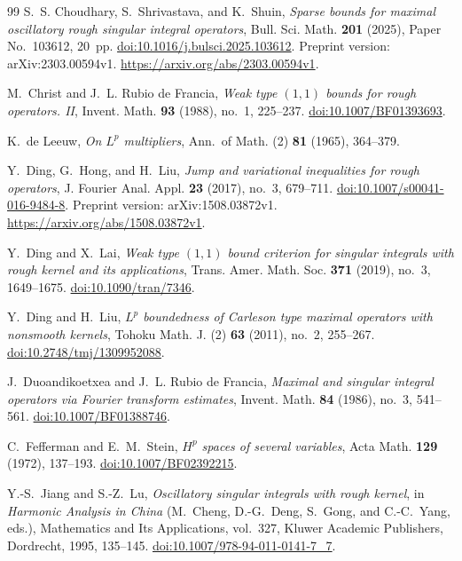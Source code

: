 \documentclass[11pt]{article}
\numberwithin{equation}{section}
\theoremstyle{remark}
\theoremstyle{definition}
\begin{document}
\begin{thebibliography}{99}
S.~S. Choudhary, S.~Shrivastava, and K.~Shuin,
\emph{Sparse bounds for maximal oscillatory rough singular integral
operators},
Bull. Sci. Math. \textbf{201} (2025), Paper No.~103612, 20~pp.
\href{https://doi.org/10.1016/j.bulsci.2025.103612}
{doi:10.1016/j.bulsci.2025.103612}.
Preprint version: arXiv:2303.00594v1.
\url{https://arxiv.org/abs/2303.00594v1}.

M.~Christ and J.~L. Rubio de Francia,
\emph{Weak type $(1,1)$ bounds for rough operators. II},
Invent. Math. \textbf{93} (1988), no.~1, 225--237.
\href{https://doi.org/10.1007/BF01393693}{doi:10.1007/BF01393693}.


K.~de Leeuw,
\emph{On $L^p$ multipliers},
Ann.\ of Math. (2) \textbf{81} (1965), 364--379.

Y.~Ding, G.~Hong, and H.~Liu,
\emph{Jump and variational inequalities for rough operators},
J. Fourier Anal. Appl. \textbf{23} (2017), no.~3, 679--711.
\href{https://doi.org/10.1007/s00041-016-9484-8}
{doi:10.1007/s00041-016-9484-8}.
Preprint version: arXiv:1508.03872v1.
\url{https://arxiv.org/abs/1508.03872v1}.

Y.~Ding and X.~Lai,
\emph{Weak type $(1,1)$ bound criterion for singular integrals with rough
kernel and its applications},
Trans. Amer. Math. Soc. \textbf{371} (2019), no.~3, 1649--1675.
\href{https://doi.org/10.1090/tran/7346}
{doi:10.1090/tran/7346}.

Y.~Ding and H.~Liu,
\emph{$L^p$ boundedness of Carleson type maximal operators with nonsmooth kernels},
Tohoku Math. J. (2) \textbf{63} (2011), no.~2, 255--267.
\href{https://doi.org/10.2748/tmj/1309952088}{doi:10.2748/tmj/1309952088}.

J.~Duoandikoetxea and J.~L. Rubio de Francia,
\emph{Maximal and singular integral operators via Fourier transform estimates},
Invent. Math. \textbf{84} (1986), no.~3, 541--561.
\href{https://doi.org/10.1007/BF01388746}{doi:10.1007/BF01388746}.

C.~Fefferman and E.~M.~Stein,
\emph{$H^p$ spaces of several variables},
Acta Math. \textbf{129} (1972), 137--193.
\href{https://doi.org/10.1007/BF02392215}{doi:10.1007/BF02392215}.

Y.-S.~Jiang and S.-Z.~Lu,
\emph{Oscillatory singular integrals with rough kernel},
in \emph{Harmonic Analysis in China}
(M.~Cheng, D.-G.~Deng, S.~Gong, and C.-C.~Yang, eds.),
Mathematics and Its Applications, vol.~327,
Kluwer Academic Publishers, Dordrecht, 1995, 135--145.
\href{https://doi.org/10.1007/978-94-011-0141-7_7}
{doi:10.1007/978-94-011-0141-7\_7}.


\end{thebibliography}
\end{document}
